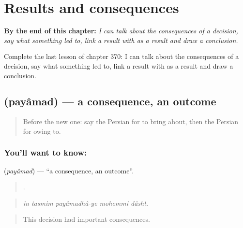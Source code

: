 
\chapter{Results and consequences}
\label{ch:fa-results-and-consequences}

\begin{chapteropening}
\textbf{By the end of this chapter:} \emph{I can talk about the consequences of a decision, say what something led to, link a result with as a result and draw a conclusion.}

Complete the last lesson of chapter 370: I can talk about the consequences of a decision, say what something led to, link a result with as a result and draw a conclusion.
\end{chapteropening}

\section[\texorpdfstring{\fa{پیامد} (payâmad)}{پیامد (payâmad)}]{ (payâmad) — a consequence, an outcome}

\label{lesson:FA-C370-payamad}



\begin{quote}
Before the new one: say the Persian for to bring about, then the Persian for owing to.
\end{quote}

\subsection*{You'll want to know: }
\textbf{} (\emph{payâmad}) — \textquotedblleft{}a consequence, an outcome\textquotedblright{}.

\begin{quote}
    .
\end{quote}

\begin{quote}
\emph{in tasmim payâmadhâ-ye mohemmi dâsht.}
\end{quote}

\begin{quote}
This decision had important consequences.
\end{quote}

